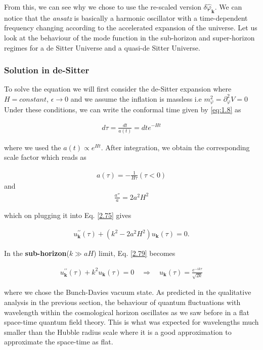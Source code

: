  From this, we can see why we chose to use the re-scaled version  $\delta \hat{\varphi}_{\mathbf{k}}$. We can notice that the \emph{ansatz} is basically a harmonic oscillator with a time-dependent frequency changing according to the accelerated expansion of the universe. Let us look at the behaviour of the mode function in the sub-horizon and super-horizon regimes for a de Sitter Universe and a quasi-de Sitter Universe.

\subsubsection*{Solution in de-Sitter}
To solve the equation we will first consider the de-Sitter expansion where $H = constant$, $\epsilon \rightarrow 0$  and we assume the inflation is massless i.e 
\(m_{\varphi}^2 = \partial_{\varphi}^2{V} = 0\)
Under these conditions, we can write the  conformal time given by \ref{eq:1.8} as

\begin{align}
    d \tau=\frac{d t}{a(t)}=d t e^{-H t} \label{2.76}
\end{align}

where we used the $a(t) \propto e^{Ht}$. After integration, we obtain the corresponding scale factor which reads as

\begin{align}
    a(\tau) = -\frac{1}{H\tau}(\tau < 0)  \label{2.77}
\end{align}
and
\begin{align}
    \frac{a''}{a} = 2a^2H^2 \label{2.78}
\end{align}

which on plugging it into Eq. \ref{2.75} gives

\begin{align}
    u_{\mathbf{k}}^{\prime \prime}(\tau)+\left(k^{2}-2 a^{2} H^{2}\right) u_{\mathbf{k}}(\tau)=0 .\label{2.79}
\end{align}



In the \textbf{sub-horizon}($k \gg a H$) limit, Eq. \ref{2.79} becomes

\begin{align}
    u_{\mathbf{k}}^{\prime \prime}(\tau)+k^{2} u_{\mathbf{k}}(\tau)=0 \quad \Rightarrow \quad u_{\mathbf{k}}(\tau)=\frac{e^{-i k \tau}}{\sqrt{2 k}} \label{2.80}
\end{align}


where we chose the Bunch-Davies vacuum state. As predicted in the qualitative analysis in the previous section, the behaviour of quantum fluctuations with wavelength within the cosmological horizon oscillates as we saw before in a flat space-time quantum field theory. This is what was expected for wavelengths much smaller than the Hubble radius scale where it is a good approximation to approximate the space-time as flat.\\

